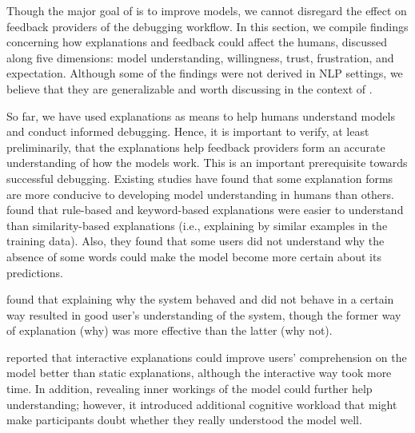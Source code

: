 \label{sec:human_factor}
Though the major goal of \EBHD is to improve models, we cannot disregard the effect on feedback providers of the debugging workflow. 
In this section, we compile findings 
concerning how explanations and feedback could affect the humans, discussed 
along five dimensions: model understanding,  willingness, trust, frustration, and expectation.
Although some of the findings were not derived in NLP settings, we believe that they are generalizable and worth discussing in the context of \EBHD.

So far, we have used explanations as means to help humans understand models and conduct informed debugging.
Hence, it is important to verify, at least preliminarily, that the explanations help feedback providers form an accurate understanding of how the models work. This is an important prerequisite towards successful debugging.
Existing studies have found that some explanation forms are more conducive to developing model understanding in humans than others. 
 found that rule-based and keyword-based explanations were easier to understand than similarity-based explanations (i.e., explaining by similar examples in the training data).
Also, they found that some users did not understand why the absence of some words could make the model become more certain about its predictions. 

found that explaining why the system behaved and did not behave in a certain way resulted in good user's understanding of the system, though the former way of explanation (why) was more effective than the latter (why not).

reported that interactive explanations could improve users’ comprehension on the model better than static explanations, although the interactive way took more time. 
In addition, 
revealing inner workings of the model could further help understanding; however, it introduced additional cognitive workload that might 
make participants doubt whether they really understood the model well.

